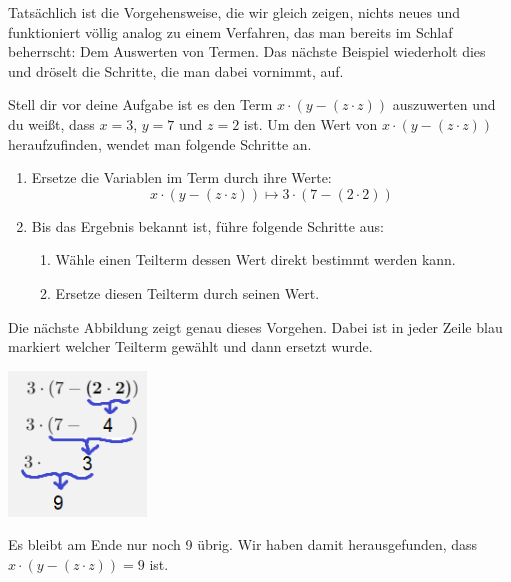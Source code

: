 \documentclass[../../main.tex]{subfiles}
\begin{document}
Tatsächlich ist die Vorgehensweise, die wir gleich zeigen, nichts neues und funktioniert völlig analog zu einem Verfahren, das man bereits im Schlaf beherrscht: Dem Auswerten von Termen. Das nächste Beispiel wiederholt dies und dröselt die Schritte, die man dabei vornimmt, auf.

\begin{example}{}
Stell dir vor deine Aufgabe ist es den Term $x \cdot (y - (z \cdot z))$ auszuwerten und du weißt, dass $x = 3$, $y = 7$ und  $z = 2$ ist.
Um den Wert von $x \cdot (y - (z \cdot z))$ heraufzufinden, wendet man folgende Schritte an.
\begin{enumerate}
    \item Ersetze die Variablen im Term durch ihre Werte:
    \[x \cdot (y - (z \cdot z)) \longmapsto 3 \cdot (7 - (2 \cdot 2)) \]
    \item Bis das Ergebnis bekannt ist, führe folgende Schritte aus:
        \begin{enumerate}
            \item Wähle einen Teilterm dessen Wert direkt bestimmt werden kann.
            \item Ersetze diesen Teilterm durch seinen Wert.
        \end{enumerate}
    \end{enumerate}
    
    Die nächste Abbildung zeigt genau dieses Vorgehen. Dabei ist in jeder Zeile blau markiert welcher Teilterm gewählt und dann ersetzt wurde.
    \begin{center}
        \includegraphics[width=0.275\textwidth]{images/TEMP_termalg.png}
    \end{center}

    Es bleibt am Ende nur noch 9 übrig. Wir haben damit herausgefunden, dass $x \cdot (y - (z \cdot z)) = 9$ ist.

\end{example}
\end{document}
